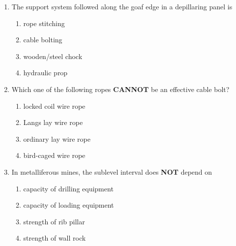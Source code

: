 \documentclass[journal]{IEEEtran}
\begin{document}
\begin{enumerate}
\item The support system followed along the goaf edge in a depillaring panel is
  \begin{enumerate}
\item rope stitching
      \item cable bolting
      \item wooden/steel chock
      \item hydraulic prop
  \end{enumerate}
  \hfill{}
\item Which one of the following ropes \textbf{CANNOT} be an effective cable bolt?
  \begin{enumerate}
\item locked coil wire rope
      \item Langs lay wire rope
      \item ordinary lay wire rope
      \item bird-caged wire rope
  \end{enumerate}
  \hfill{}
\item In metalliferous mines, the sublevel interval does \textbf{NOT} depend on
  \begin{enumerate}
\item capacity of drilling equipment
      \item capacity of loading equipment
      \item strength of rib pillar
      \item strength of wall rock
  \end{enumerate}
  \hfill{}


\end{enumerate}
\end{document}
